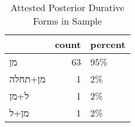 \begin{table}[htbp!]
\centering
\caption{Attested Posterior Durative Forms in Sample}
\label{table:postdur_front}
\begin{tabular}{lrl}
\toprule
{} &  count & percent \\
\midrule
\texthebrew{מן}      &     63 &     95\% \\
\texthebrew{מן+תחלה} &      1 &      2\% \\
\texthebrew{ל+מן}    &      1 &      2\% \\
\texthebrew{מן+ל}    &      1 &      2\% \\
\bottomrule
\end{tabular}
\end{table}

